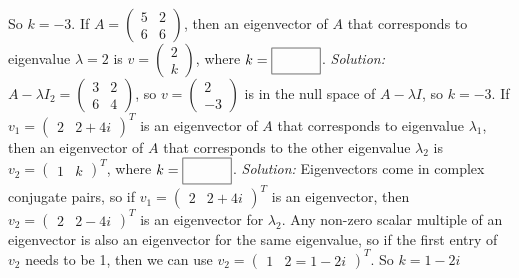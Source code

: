 \begin{parts}
{        So $k=-3$. }
        \fi    
    \fi 
    \ifnum {}
        If $A = \begin{pmatrix} 5&2\\6&6\end{pmatrix}$, then an eigenvector of $A$ that corresponds to eigenvalue $\lambda=2$ is $v = \begin{pmatrix} 2\\k\end{pmatrix}$, where $k = \framebox{\strut\hspace{1cm}}$.     
        \ifnum {} {\color{DarkBlue} \textit{Solution:} $A - \lambda I_2 = \begin{pmatrix} 3&2\\6&4\end{pmatrix}$, so $v = \begin{pmatrix} 2\\-3\end{pmatrix}$ is in the null space of $A - \lambda I$, so $k = -3$.} \fi    
    \fi 
    \ifnum {}
        If $v_1 = \begin{pmatrix} 2 & 2+4i\end{pmatrix}^T$ is an eigenvector of $A$ that corresponds to eigenvalue $\lambda_1$, then an eigenvector of $A$ that corresponds to the other eigenvalue $\lambda_2$ is $v_2 = \begin{pmatrix} 1 & k\end{pmatrix}^T$, where $k = \framebox{\strut\hspace{1cm}}$.     
        \ifnum {} {\color{DarkBlue} \textit{Solution:} Eigenvectors come in complex conjugate pairs, so if $v_1 = \begin{pmatrix} 2 & 2+4i\end{pmatrix}^T$ is an eigenvector, then $v_2 = \begin{pmatrix} 2 & 2-4i\end{pmatrix}^T$ is an eigenvector for $\lambda_2$. Any non-zero scalar multiple of an eigenvector is also an eigenvector for the same eigenvalue, so if the first entry of $v_2$ needs to be 1, then we can use $v_2 = \begin{pmatrix} 1 & 2=1-2i\end{pmatrix}^T$. So $k = 1-2i$} \fi     

\end{parts}
